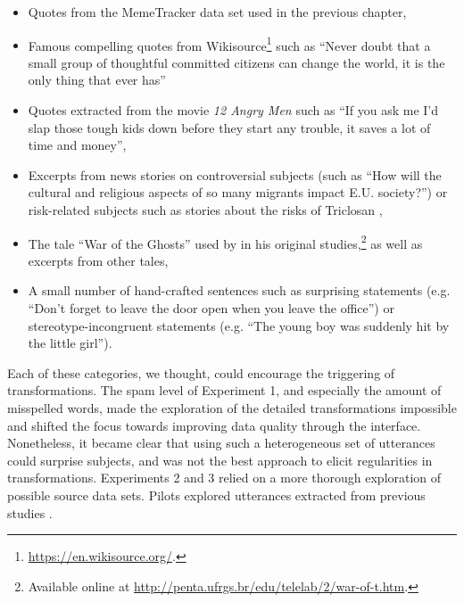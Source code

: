 \begin{itemize}
\item
  Quotes from the MemeTracker data set used in the previous chapter,
\item
  Famous compelling quotes from Wikisource\footnote{\url{https://en.wikisource.org/}.}
  such as \enquote{Never doubt that a small group of thoughtful
  committed citizens can change the world, it is the only thing that
  ever has}
\item
  Quotes extracted from the movie \emph{12 Angry Men} such as
  \enquote{If you ask me I'd slap those tough kids down before they
  start any trouble, it saves a lot of time and money},
\item
  Excerpts from news stories on controversial subjects (such as
  \enquote{How will the cultural and religious aspects of so many
  migrants impact E.U. society?}) or risk-related subjects such as
  stories about the risks of Triclosan \autocite[used by][ in their
  study of the amplification of risk
  perception]{moussaid_amplification_2015},
\item
  The tale \enquote{War of the Ghosts} used by
  \textcite{bartlett_remembering:_1995} in his original
  studies,\footnote{Available online at
    \url{http://penta.ufrgs.br/edu/telelab/2/war-of-t.htm}.} as well as
  excerpts from other tales,
\item
  A small number of hand-crafted sentences such as surprising statements
  (e.g. \enquote{Don't forget to leave the door open when you leave the
  office}) or stereotype-incongruent statements (e.g. \enquote{The young
  boy was suddenly hit by the little girl}).
\end{itemize}

Each of these categories, we thought, could encourage the triggering of
transformations. The spam level of Experiment 1, and especially the
amount of misspelled words, made the exploration of the detailed
transformations impossible and shifted the focus towards improving data
quality through the interface. Nonetheless, it became clear that using
such a heterogeneous set of utterances could surprise subjects, and was
not the best approach to elicit regularities in transformations.
Experiments 2 and 3 relied on a more thorough exploration of possible
source data sets. Pilots explored utterances extracted from previous
studies \autocites[ on personification and increased
stereotypes]{bangerter_transformation_2000}[ on the role of
disgust]{heath_emotional_2001}[ on incoherent
stories]{maxwell_remembering_1936}[ for the role of social
information]{mesoudi_bias_2006}.

